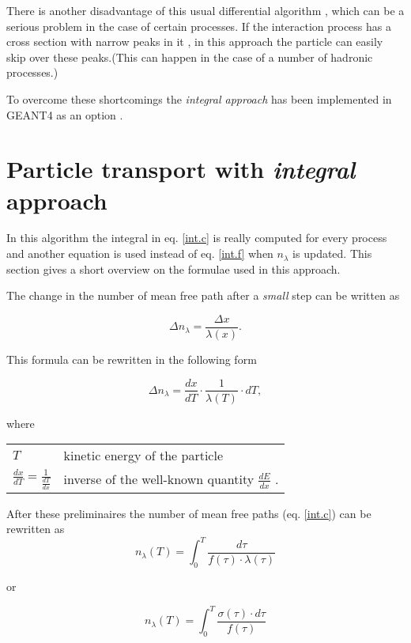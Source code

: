  There is another disadvantage of this usual differential algorithm , 
 which can be a serious problem in the case of certain processes. If the
 interaction process has a cross section with narrow peaks in it , 
in this approach the particle can easily skip over these peaks.(This can happen
 in the case of a number of hadronic processes.)

 To overcome these shortcomings the {\em integral approach} has been implemented
 in GEANT4 as an option .

\section{Particle transport with {\em integral} approach}

 In this algorithm the integral in eq. \ref{int.c} is really computed for every
 process and another equation is used instead of eq. \ref{int.f} when 
 $n_\lambda$ is updated. This section gives a short overview on the formulae
 used in this approach.

  The change in the number of mean free path after a {\em small} step
 can be written as

\begin{equation}
\label{int.g}
   \Delta n_\lambda = \frac{\Delta x}{\lambda (x)} .
\end{equation} 

This formula can be rewritten in the following form

\begin{equation}
\label{int.h}
   \Delta n_\lambda = \frac{dx}{dT}\cdot \frac{1}{\lambda (T)} \cdot dT  ,
\end{equation} 

where 
\begin{tabular}[t]{ll}
$T$         & kinetic energy of the particle \\  
$\frac{dx}{dT} = \frac{1}{\frac{dT}{dx}}$ & inverse of the well-known quantity {\em $\frac{dE}{dx}$}  . \\
\end{tabular}

After these preliminaires the number of mean free paths (eq. \ref{int.c})
 can be rewritten as 
\begin{equation}
\label{int.i}
n_\lambda (T) = \int_{0}^{T}\frac{d\tau}{f(\tau)\cdot \lambda (\tau)}   
\end{equation}

 or

\begin{equation}
\label{int.j}
n_\lambda (T) = \int_{0}^{T}\frac{\sigma (\tau ) \cdot d\tau}{f(\tau) }  
\end{equation}

